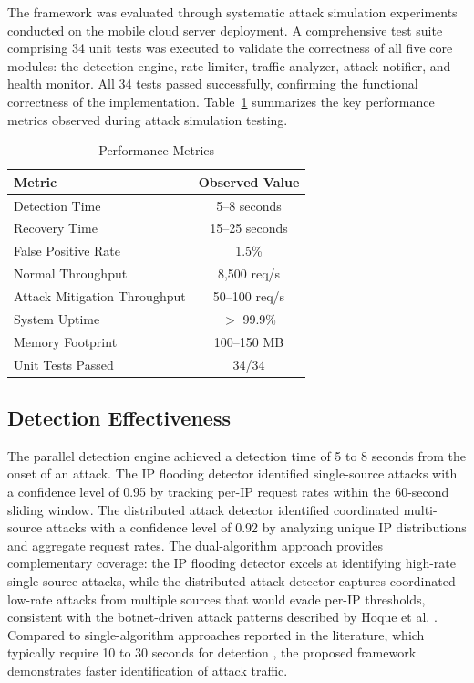 \documentclass[conference]{IEEEtran}
\begin{document}
The framework was evaluated through systematic attack simulation experiments conducted on the mobile cloud server deployment. A comprehensive test suite comprising 34 unit tests was executed to validate the correctness of all five core modules: the detection engine, rate limiter, traffic analyzer, attack notifier, and health monitor. All 34 tests passed successfully, confirming the functional correctness of the implementation. Table~\ref{tab_perf} summarizes the key performance metrics observed during attack simulation testing.

\begin{table}[htbp]
\caption{Performance Metrics}
\begin{center}
\begin{tabular}{|l|c|}
\hline
\textbf{Metric} & \textbf{Observed Value} \\
\hline
Detection Time & 5--8 seconds \\
\hline
Recovery Time & 15--25 seconds \\
\hline
False Positive Rate & 1.5\% \\
\hline
Normal Throughput & 8,500 req/s \\
\hline
Attack Mitigation Throughput & 50--100 req/s \\
\hline
System Uptime & $>$ 99.9\% \\
\hline
Memory Footprint & 100--150 MB \\
\hline
Unit Tests Passed & 34/34 \\
\hline
\end{tabular}
\label{tab_perf}
\end{center}
\end{table}

\subsection{Detection Effectiveness}

The parallel detection engine achieved a detection time of 5 to 8 seconds from the onset of an attack. The IP flooding detector identified single-source attacks with a confidence level of 0.95 by tracking per-IP request rates within the 60-second sliding window. The distributed attack detector identified coordinated multi-source attacks with a confidence level of 0.92 by analyzing unique IP distributions and aggregate request rates. The dual-algorithm approach provides complementary coverage: the IP flooding detector excels at identifying high-rate single-source attacks, while the distributed attack detector captures coordinated low-rate attacks from multiple sources that would evade per-IP thresholds, consistent with the botnet-driven attack patterns described by Hoque et al. \cite{b10}. Compared to single-algorithm approaches reported in the literature, which typically require 10 to 30 seconds for detection \cite{b4}, the proposed framework demonstrates faster identification of attack traffic.
\end{document}
